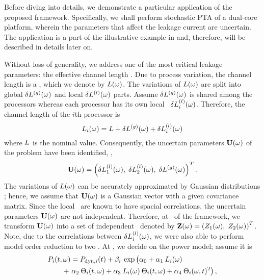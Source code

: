 Before diving into details, we demonstrate a particular application of the proposed framework. Specifically, we shall perform stochastic PTA of a dual-core platform, wherein the parameters that affect the leakage current are uncertain. The application is a part of the illustrative example in  and, therefore, will be described in details later on.



Without loss of generality, we address one of the most critical leakage parameters: the effective channel length \cite{chandra2010, juan2011, juan2012, srivastava2010, shen2009}. Due to process variation, the channel length is a \rv, which we denote by $L(\omega)$. The variations of $L(\omega)$ are split into global ${\delta L^{(g)}}(\omega)$ and local $\delta L^{(l)}(\omega)$ parts. Assume ${\delta L^{(g)}}(\omega)$ is shared among the processors whereas each processor has its own local \rv\ $\delta L^{(l)}_i(\omega)$. Therefore, the channel length of the $i$th processor is
\begin{equation} \elabel{leakage-partition}
  \Leff_i(\o) = \nLeff + \gLeff(\o) + \lLeff_i(\o)
\end{equation}
where $L$ is the nominal value. Consequently, the uncertain parameters $\mathbf{U}(\omega)$ of the problem have been identified, \ie,
\[
  \mathbf{U}(\omega) = \left(\delta L^{(l)}_1(\omega), \; \delta L^{(l)}_2(\omega), \; {\delta L^{(g)}}(\omega) \right)^T.
\]
The variations of $L(\omega)$ can be accurately approximated by Gaussian distributions \cite{juan2011, juan2012, srivastava2010}; hence, we assume that $\mathbf{U}(\omega)$ is a Gaussian vector with a given covariance matrix. Since the local \rvs\ are known to have spacial correlations, the uncertain parameters $\mathbf{U}(\omega)$ are not independent. Therefore, at \ of the framework, we transform $\mathbf{U}(\omega)$ into a set of independent \rvs\ denoted by $\mathbf{Z}(\omega) = \left(Z_1(\omega), \; Z_2(\omega)\right)^T$. Note, due to the correlations between $\delta L^{(l)}_i(\omega)$, we were also able to perform model order reduction to two \rvs. At , we decide on the power model; assume it is
\begin{align*}
  & \P_i(\t, \o) = \P_{\dyn, i}(\t) + \beta_i \: \exp \left(\vphantom{\T^2_i} \alpha_0 + \alpha_1 \: \Leff_i(\o) \right. \\
  & \qquad {} + \left. \alpha_2 \: \T_i(\t, \o) + \alpha_3 \: \Leff_i(\o) \: \T_i(\t, \o) + \alpha_4 \: \T_i(\o, \t)^2 \right),
\end{align*}

